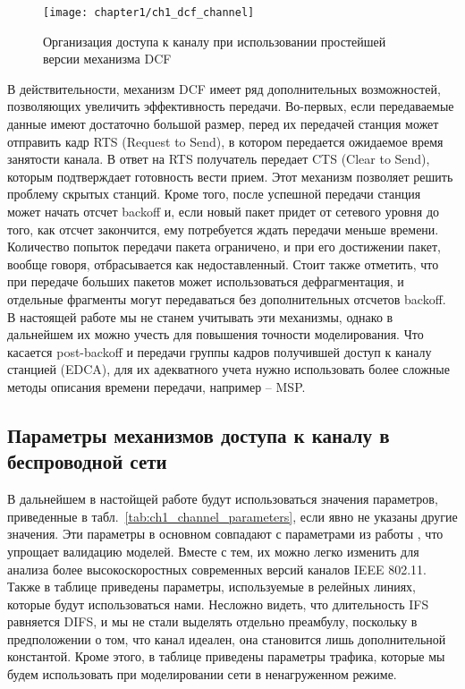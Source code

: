 \begin{figure}[h!]
   \centering
    \texttt{[image: chapter1/ch1\_dcf\_channel]}
	\caption{Организация доступа к каналу при использовании простейшей версии механизма DCF}
	\label{fig:dcf}
\end{figure}

В действительности, механизм DCF имеет ряд дополнительных возможностей, позволяющих увеличить эффективность передачи. Во-первых, если передаваемые данные имеют достаточно большой размер, перед их передачей станция может отправить кадр RTS (Request to Send), в котором передается ожидаемое время занятости канала. В ответ на RTS получатель передает CTS (Clear to Send), которым подтверждает готовность вести прием. Этот механизм позволяет решить проблему скрытых станций. Кроме того, после успешной передачи станция может начать отсчет backoff и, если новый пакет придет от сетевого уровня до того, как отсчет закончится, ему потребуется ждать передачи меньше времени. Количество попыток передачи пакета ограничено, и при его достижении пакет, вообще говоря, отбрасывается как недоставленный. Стоит также отметить, что при передаче больших пакетов может использоваться дефрагментация, и отдельные фрагменты могут передаваться без дополнительных отсчетов backoff. В настоящей работе мы не станем учитывать эти механизмы, однако в дальнейшем их можно учесть для повышения точности моделирования. Что касается post-backoff и передачи группы кадров получившей доступ к каналу станцией (EDCA), для их адекватного учета нужно использовать более сложные методы описания времени передачи, например -- MSP.

\subsection{Параметры механизмов доступа к каналу в беспроводной сети}

В дальнейшем в настойщей работе будут использоваться значения параметров, приведенные в табл.~\ref{tab:ch1_channel_parameters}, если явно не указаны другие значения. Эти параметры в основном совпадают с параметрами из работы \cite{Bianchi2000}, что упрощает валидацию моделей. Вместе с тем, их можно легко изменить для анализа более высокоскоростных современных версий каналов IEEE 802.11. Также в таблице приведены параметры, используемые в релейных линиях, которые будут использоваться нами. Несложно видеть, что длительность IFS равняется DIFS, и мы не стали выделять отдельно преамбулу, поскольку в предположении о том, что канал идеален, она становится лишь дополнительной константой. Кроме этого, в таблице приведены параметры трафика, которые мы будем использовать при моделировании сети в ненагруженном режиме.

